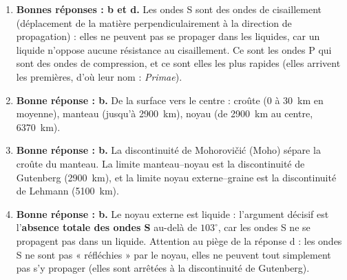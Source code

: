 \documentclass[11pt]{article}
\newcommand{\cle}[1]{{\popxbold\color{popdark}#1}}
\begin{document}
\begin{corrige}
\begin{enumerate}
\item \textbf{Bonnes réponses : b et d.} Les ondes S sont des ondes de \cle{cisaillement} (déplacement de la matière perpendiculairement à la direction de propagation) : elles ne peuvent pas se propager dans les liquides, car un liquide n'oppose aucune résistance au cisaillement. Ce sont les ondes P qui sont des ondes de compression, et ce sont elles les plus rapides (elles arrivent les premières, d'où leur nom : \emph{Primae}).
\item \textbf{Bonne réponse : b.} De la surface vers le centre : \cle{croûte} (0 à \SI{30}{km} en moyenne), \cle{manteau} (jusqu'à \SI{2900}{km}), \cle{noyau} (de \SI{2900}{km} au centre, \SI{6370}{km}).
\item \textbf{Bonne réponse : b.} La discontinuité de \cle{Mohorovičić} (Moho) sépare la croûte du manteau. La limite manteau--noyau est la discontinuité de \cle{Gutenberg} (\SI{2900}{km}), et la limite noyau externe--graine est la discontinuité de \cle{Lehmann} (\SI{5100}{km}).
\item \textbf{Bonne réponse : b.} Le noyau externe est \cle{liquide} : l'argument décisif est l'\textbf{absence totale des ondes S} au-delà de $103^{\circ}$, car les ondes S ne se propagent pas dans un liquide. Attention au piège de la réponse d : les ondes S ne sont pas « réfléchies » par le noyau, elles ne peuvent tout simplement pas s'y propager (elles sont arrêtées à la discontinuité de Gutenberg).
\end{enumerate}
\end{corrige}
\end{document}
